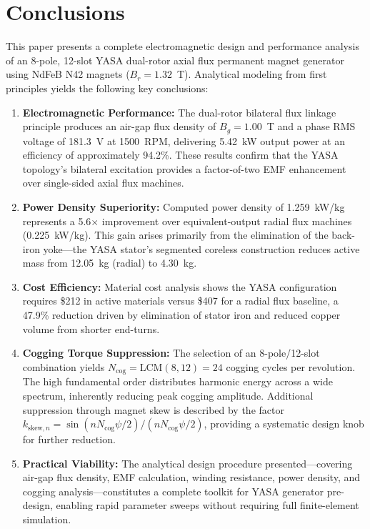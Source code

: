 \documentclass[12pt,a4paper]{article}
\begin{document}
\section{Conclusions}
This paper presents a complete electromagnetic design and performance analysis of an 8-pole, 12-slot YASA dual-rotor axial flux permanent magnet generator using NdFeB N42 magnets ($B_r = 1.32$~T). Analytical modeling from first principles yields the following key conclusions:

\begin{enumerate}
\item \textbf{Electromagnetic Performance:} The dual-rotor bilateral flux linkage principle produces an air-gap flux density of $B_g = 1.00$~T and a phase RMS voltage of 181.3~V at 1500~RPM, delivering 5.42~kW output power at an efficiency of approximately 94.2\%. These results confirm that the YASA topology's bilateral excitation provides a factor-of-two EMF enhancement over single-sided axial flux machines.

\item \textbf{Power Density Superiority:} Computed power density of 1.259~kW/kg represents a 5.6$\times$ improvement over equivalent-output radial flux machines (0.225~kW/kg). This gain arises primarily from the elimination of the back-iron yoke—the YASA stator's segmented coreless construction reduces active mass from 12.05~kg (radial) to 4.30~kg.

\item \textbf{Cost Efficiency:} Material cost analysis shows the YASA configuration requires \$212 in active materials versus \$407 for a radial flux baseline, a 47.9\% reduction driven by elimination of stator iron and reduced copper volume from shorter end-turns.

\item \textbf{Cogging Torque Suppression:} The selection of an 8-pole/12-slot combination yields $N_{\text{cog}} = \text{LCM}(8,12) = 24$ cogging cycles per revolution. The high fundamental order distributes harmonic energy across a wide spectrum, inherently reducing peak cogging amplitude. Additional suppression through magnet skew is described by the factor $k_{\text{skew},n} = \sin(n N_{\text{cog}} \psi/2)/(n N_{\text{cog}} \psi/2)$, providing a systematic design knob for further reduction.

\item \textbf{Practical Viability:} The analytical design procedure presented—covering air-gap flux density, EMF calculation, winding resistance, power density, and cogging analysis—constitutes a complete toolkit for YASA generator pre-design, enabling rapid parameter sweeps without requiring full finite-element simulation.
\end{enumerate}
\end{document}
